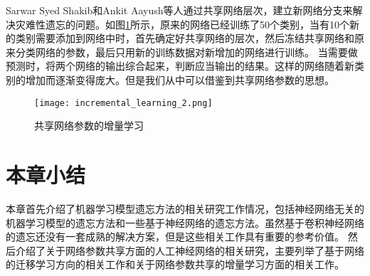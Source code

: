 Sarwar Syed Shakib和Ankit Aayush等人\cite{Sarwar_2020}通过共享网络层次，建立新网络分支来解决灾难性遗忘的问题。如图\ref{fig:incremental_learning_2}所示，原来的网络已经训练了50个类别，当有10个新的类别需要添加到网络中时，首先确定好共享网络的层次，然后冻结共享网络和原来分类网络的参数，最后只用新的训练数据对新增加的网络进行训练。
当需要做预测时，将两个网络的输出综合起来，判断应当输出的结果。这样的网络随着新类别的增加而逐渐变得庞大。但是我们从中可以借鉴到共享网络参数的思想。
\begin{figure}
    \centering
    \texttt{[image: incremental\_learning\_2.png]}
    \caption{共享网络参数的增量学习\cite{Sarwar_2020}}
    \label{fig:incremental_learning_2}
\end{figure}


\section{本章小结}
本章首先介绍了机器学习模型遗忘方法的相关研究工作情况，包括神经网络无关的机器学习模型的遗忘方法和一些基于神经网络的遗忘方法。虽然基于卷积神经网络的遗忘还没有一套成熟的解决方案，但是这些相关工作具有重要的参考价值。
然后介绍了关于网络参数共享方面的人工神经网络的相关研究，主要列举了基于网络的迁移学习方向的相关工作和关于网络参数共享的增量学习方面的相关工作。